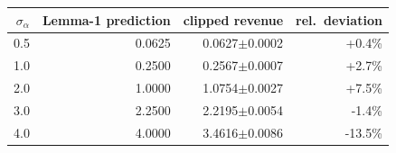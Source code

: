\begin{tabular}{rrrr}
\toprule
$\sigma_\alpha$ & Lemma-1 prediction & clipped revenue & rel.\ deviation \\
\midrule
0.5 & 0.0625 & 0.0627$\pm$0.0002 & +0.4\% \\
1.0 & 0.2500 & 0.2567$\pm$0.0007 & +2.7\% \\
2.0 & 1.0000 & 1.0754$\pm$0.0027 & +7.5\% \\
3.0 & 2.2500 & 2.2195$\pm$0.0054 & -1.4\% \\
4.0 & 4.0000 & 3.4616$\pm$0.0086 & -13.5\% \\
\bottomrule
\end{tabular}
